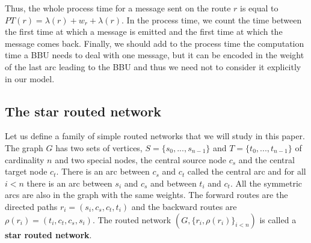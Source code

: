 \documentclass[10pt, conference, letterpaper]{IEEEtran}
\begin{document}
    
      Thus, the whole process time for a message sent on the route $r$ is equal to
      $PT(r)=\lambda(r)+ w_r+\lambda(r)$.      
      In the process time, we count the time between the first time at which a message is emitted and the first time at which the message comes back. 
      Finally, we should add to the process time the computation time a BBU needs to deal with one message, but it can be encoded  in the weight of the last arc leading to the BBU and thus we need not to consider it explicitly in our model.

    
    \subsection{The star routed network}
    
             Let us define a family of simple routed networks that we will study in this paper. 
      The graph $G$ has two sets of vertices, $S=\{s_0,...,s_{n-1}\}$ and $T=\{t_0,...,t_{n-1}\}$ of cardinality $n$ and two special nodes, the central source node $c_s$ and the central target node $c_t$.
      There is an arc between $c_s$ and  $c_t$ called the central arc and for all $i<n$ there is an arc between $s_i$ and $c_s$ and between $t_i$ and $c_t$. All the symmetric arcs are also in the graph with the same weights.
      The forward routes are the directed paths $r_i = (s_i,c_s,c_t,t_i)$ and the backward routes are $\rho(r_i) = (t_i,c_t,c_s,s_i)$. The routed network $(G, \{r_i,\rho(r_i)\}_{i<n})$ is called a \textbf{star routed network}.
      
       \begin{center}

  \end{center}
	
\end{document}
